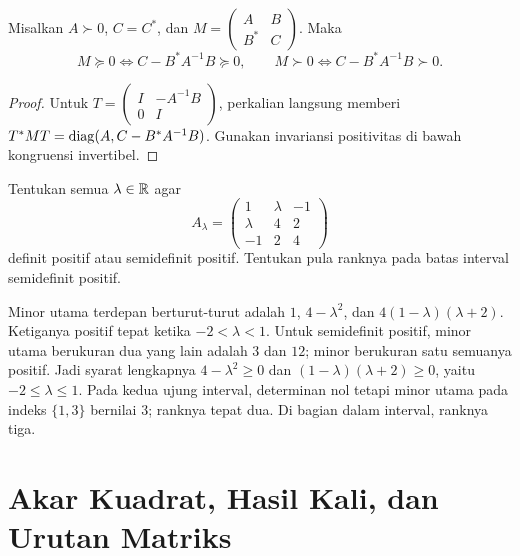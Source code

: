 \begin{prop}
    \label{khusus:schur}
    Misalkan $A\succ0$, $C=C^*$, dan
    $M=\begin{pmatrix}A&B\\B^*&C\end{pmatrix}$. Maka
    \[
        M\succeq0\iff C-B^*A^{-1}B\succeq0,
        \qquad
        M\succ0\iff C-B^*A^{-1}B\succ0.
    \]
\end{prop}
\begin{proof}
    Untuk $T=\begin{pmatrix}I&-A^{-1}B\\0&I\end{pmatrix}$,
    perkalian langsung memberi
    $T^*MT=\operatorname{diag}(A,C-B^*A^{-1}B)$.
    Gunakan invariansi positivitas di bawah kongruensi invertibel.
\end{proof}

\begin{exam}
    Tentukan semua $\lambda\in\mathbb{R}$ agar
    \[
        A_\lambda=\begin{pmatrix}
            1&\lambda&-1\\\lambda&4&2\\-1&2&4
        \end{pmatrix}
    \]
    definit positif atau semidefinit positif. Tentukan pula ranknya
    pada batas interval semidefinit positif.
\end{exam}
\begin{solution}
    Minor utama terdepan berturut-turut adalah
    $1$, $4-\lambda^2$, dan $4(1-\lambda)(\lambda+2)$.
    Ketiganya positif tepat ketika $-2<\lambda<1$.
    Untuk semidefinit positif, minor utama berukuran dua yang lain
    adalah $3$ dan $12$; minor berukuran satu semuanya positif.
    Jadi syarat lengkapnya
    $4-\lambda^2\ge0$ dan $(1-\lambda)(\lambda+2)\ge0$,
    yaitu $-2\le\lambda\le1$.
    Pada kedua ujung interval, determinan nol tetapi minor utama
    pada indeks $\{1,3\}$ bernilai $3$; ranknya tepat dua.
    Di bagian dalam interval, ranknya tiga.
\end{solution}

\section{Akar Kuadrat, Hasil Kali, dan Urutan Matriks}
\label{khusus:akar}

